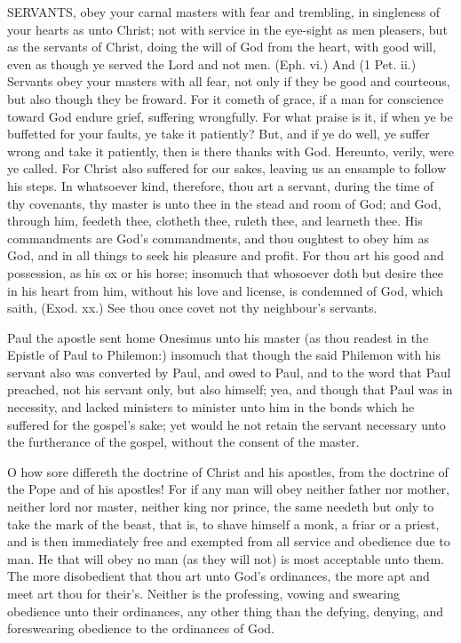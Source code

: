 SERVANTS, obey your carnal masters with fear and 
trembling, in singleness of your hearts as unto Christ;
not with service in the eye-sight as men pleasers, but as 
the servants of Christ, doing the will of God from the 
heart, with good will, even as though ye served the Lord 
and not men. (Eph. vi.) And (1 Pet. ii.) Servants obey 
your masters with all fear, not only if they be good and 
courteous, but also though they be froward. For it cometh 
of grace, if a man for conscience toward God endure 
grief, suffering wrongfully. For what praise is it, if when 
ye be buffetted for your faults, ye take it patiently? But, 
and if ye do well, ye suffer wrong and take it patiently, 
then is there thanks with God. Hereunto, verily, were ye 
called. For Christ also suffered for our sakes, leaving us 
an ensample to follow his steps. In whatsoever kind, therefore,
thou art a servant, during the time of thy covenants, 
thy master is unto thee in the stead and room of God;
and God, through him, feedeth thee, clotheth thee, ruleth 
thee, and learneth thee. His commandments are God's 
commandments, and thou oughtest to obey him as God, 
and in all things to seek his pleasure and profit. For 
thou art his good and possession, as his ox or his horse;
insomuch that whosoever doth but desire thee in his heart 
from him, without his love and license, is condemned of 
God, which saith, (Exod. xx.) See thou once covet not 
thy neighbour's servants. 

Paul the apostle sent home Onesimus unto his master 
(as thou readest in the Epistle of Paul to Philemon:) 
insomuch that though the said Philemon with his servant 
also was converted by Paul, and owed to Paul, and 
to the word that Paul preached, not his servant only, but 
also himself; yea, and though that Paul was in necessity, 
and lacked ministers to minister unto him in the bonds 
which he suffered for the gospel's sake; yet would he not 
retain the servant necessary unto the furtherance of the 
gospel, without the consent of the master.

O how sore differeth the doctrine of Christ and his 
apostles, from the doctrine of the Pope and of his apostles!
For if any man will obey neither father nor 
mother, neither lord nor master, neither king nor prince, 
the same needeth but only to take the mark of the beast, 
that is, to shave himself a monk, a friar or a priest, and is 
then immediately free and exempted from all service and 
obedience due to man. He that will obey no man (as 
they will not) is most acceptable unto them. The more 
disobedient that thou art unto God's ordinances, the more 
apt and meet art thou for their's. Neither is the professing, 
vowing and swearing obedience unto their ordinances, any 
other thing than the defying, denying, and foreswearing 
obedience to the ordinances of God.


